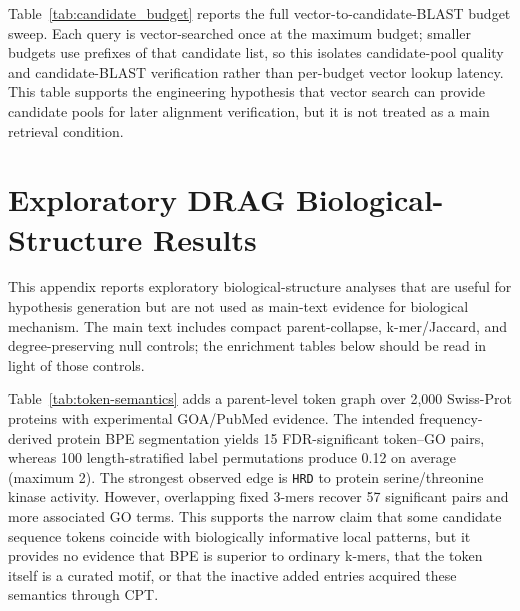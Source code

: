 \documentclass[11pt]{article}
\begin{document}
Table~\ref{tab:candidate_budget} reports the full vector-to-candidate-BLAST budget sweep. Each query is vector-searched once at the maximum budget; smaller budgets use prefixes of that candidate list, so this isolates candidate-pool quality and candidate-BLAST verification rather than per-budget vector lookup latency. This table supports the engineering hypothesis that vector search can provide candidate pools for later alignment verification, but it is not treated as a main retrieval condition.

\begin{table}[h]
\centering
\caption{Vector-to-candidate-BLAST budget sweep on the 100-query sequence-window stress test.}
\label{tab:candidate_budget}
\end{table}

\section{Exploratory DRAG Biological-Structure Results}
\label{app:drag-exploratory}

This appendix reports exploratory biological-structure analyses that are useful for hypothesis generation but are not used as main-text evidence for biological mechanism. The main text includes compact parent-collapse, k-mer/Jaccard, and degree-preserving null controls; the enrichment tables below should be read in light of those controls.

Table~\ref{tab:token-semantics} adds a parent-level token graph over 2,000 Swiss-Prot proteins with experimental GOA/PubMed evidence. The intended frequency-derived protein BPE segmentation yields 15 FDR-significant token--GO pairs, whereas 100 length-stratified label permutations produce 0.12 on average (maximum 2). The strongest observed edge is \texttt{HRD} to protein serine/threonine kinase activity. However, overlapping fixed 3-mers recover 57 significant pairs and more associated GO terms. This supports the narrow claim that some candidate sequence tokens coincide with biologically informative local patterns, but it provides no evidence that BPE is superior to ordinary k-mers, that the token itself is a curated motif, or that the inactive added entries acquired these semantics through CPT.
\end{document}
